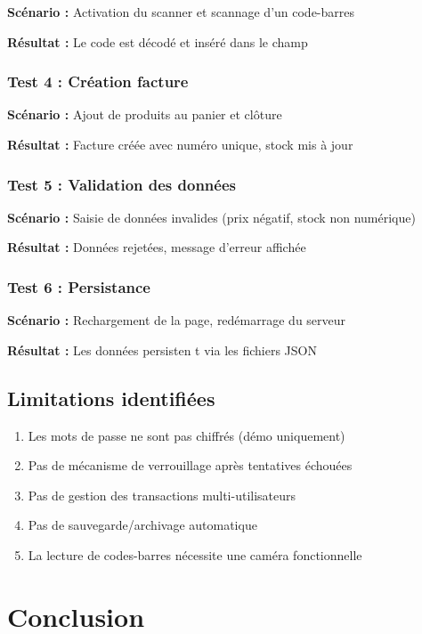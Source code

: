 \documentclass[12pt,a4paper,french]{report}
\begin{document}
\textbf{Scénario :} Activation du scanner et scannage d'un code-barres

\textbf{Résultat :} Le code est décodé et inséré dans le champ

\subsection{Test 4 : Création facture}

\textbf{Scénario :} Ajout de produits au panier et clôture

\textbf{Résultat :} Facture créée avec numéro unique, stock mis à jour

\subsection{Test 5 : Validation des données}

\textbf{Scénario :} Saisie de données invalides (prix négatif, stock non numérique)

\textbf{Résultat :} Données rejetées, message d'erreur affichée

\subsection{Test 6 : Persistance}

\textbf{Scénario :} Rechargement de la page, redémarrage du serveur

\textbf{Résultat :} Les données persisten t via les fichiers JSON

\section{Limitations identifiées}

\begin{enumerate}
    \item Les mots de passe ne sont pas chiffrés (démo uniquement)
    \item Pas de mécanisme de verrouillage après tentatives échouées
    \item Pas de gestion des transactions multi-utilisateurs
    \item Pas de sauvegarde/archivage automatique
    \item La lecture de codes-barres nécessite une caméra fonctionnelle
\end{enumerate}

\chapter{Conclusion}
\end{document}
